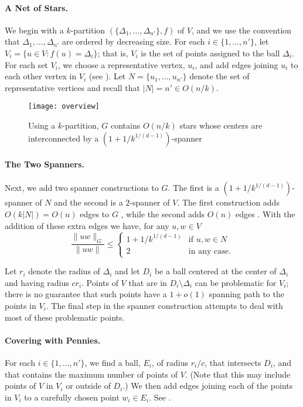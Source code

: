 \documentclass{patmorin}
\begin{document}
\paragraph{A Net of Stars.}
We begin with a $k$-partition $(\{\Delta_1,\ldots,\Delta_{n'}\},f)$
of $V$, and we use the convention that $\Delta_1,\ldots,\Delta_{n'}$
are ordered by decreasing size.  For each $i\in \{1,\ldots,n'\}$,
let $V_i=\{u\in V : f(u)=\Delta_i\}$; that is, $V_i$ is the set of
points assigned to the ball $\Delta_i$.  For each set $V_i$, we choose a
representative vertex, $u_i$, and add edges joining $u_i$ to each other
vertex in $V_i$ (see ). Let $N=\{u_1,\ldots,u_{n'}\}$
denote the set of representative vertices and recall that $|N|=n'\in
O(n/k)$.

\begin{figure}
  \begin{center} 
    \texttt{[image: overview]}
  \end{center} 
  \caption{Using a $k$-partition, $G$ contains $O(n/k)$ stars whose
    centers are interconnected by a $(1+1/k^{1/(d-1)})$-spanner}
\end{figure}

\paragraph{The Two Spanners.}
Next, we add two spanner constructions to $G$.  The first is a
$(1+1/k^{1/(d-1)})$-spanner of $N$ and the second is a $2$-spanner
of $V$.  The first construction adds $O(k|N|)=O(n)$ edges to $G$
\cite[Section~5.5]{narasimhan.smid:geometric}, while the second adds
$O(n)$ edges \cite{x,ys,ss}.  With the addition of these extra edges we
have, for any $u,w\in V$
\[
   \frac{\|uw\|_G}{\|uw\|} \le \begin{cases}
         1+1/k^{1/(d-1)} & \text{if $u,w\in N$} \\
         2 & \text{in any case.}
       \end{cases}
\]

Let $r_i$ denote the radius of $\Delta_i$ and let $D_i$ be a ball centered
at the center of $\Delta_i$ and having radius $cr_i$.  Points of $V$
that are in $D_i\setminus \Delta_i$ can be problematic for $V_i$; there
is no guarantee that such points have a $1+o(1)$ spanning path to the
points in $V_i$.  The final step in the spanner construction attempts
to deal with most of these problematic points.

\paragraph{Covering with Pennies.}
For each $i\in\{1,\ldots,n'\}$, we find a ball, $E_i$, of radius $r_i/c$,
that intersects $D_i$, and that contains the maximum number of points
of $V$.  (Note that this may include points of $V$ in $V_i$ or outside
of $D_i$.)  We then add edges joining each of the points in $V_i$ to
a carefully chosen point $w_i\in E_i$.  See .
\end{document}
